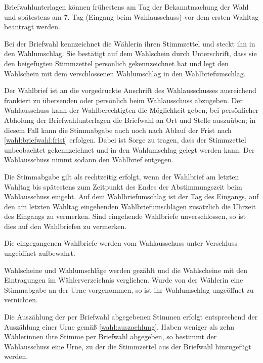 Briefwahlunterlagen können frühestens am Tag der Bekanntmachung der Wahl und spätestens am 7. Tag (Eingang beim Wahlausschuss) vor dem ersten Wahltag beantragt werden. \label{wahl:briefwahl:frist}

Bei der Briefwahl kennzeichnet die Wählerin ihren Stimmzettel und steckt ihn in den Wahlumschlag. Sie bestätigt auf dem Wahlschein durch Unterschrift, dass sie den beigefügten Stimmzettel persönlich gekennzeichnet hat und legt den Wahlschein mit dem verschlossenen Wahlumschlag in den Wahlbriefumschlag.

Der Wahlbrief ist an die vorgedruckte Anschrift des Wahlausschusses ausreichend frankiert zu übersenden oder persönlich beim Wahlausschuss abzugeben. Der Wahlausschuss kann der Wahlberechtigten die Möglichkeit geben, bei persönlicher Abholung der Briefwahlunterlagen die Briefwahl an Ort und Stelle auszuüben; in diesem Fall kann die Stimmabgabe auch noch nach Ablauf der Frist nach \ref{wahl:briefwahl:frist} erfolgen. Dabei ist Sorge zu tragen, dass der Stimmzettel unbeobachtet gekennzeichnet und in den Wahlumschlag gelegt werden kann. Der Wahlausschuss nimmt sodann den Wahlbrief entgegen.

Die Stimmabgabe gilt als rechtzeitig erfolgt, wenn der Wahlbrief am letzten Wahltag bis spätestens zum Zeitpunkt des Endes der Abstimmungszeit beim Wahlausschuss eingeht. Auf dem Wahlbriefumschlag ist der Tag des Eingangs, auf den am letzten Wahltag eingehenden Wahlbriefumschlägen zusätzlich die Uhrzeit des Eingangs zu vermerken. Sind eingehende Wahlbriefe unverschlossen, so ist dies auf den Wahlbriefen zu vermerken.

Die eingegangenen Wahlbriefe werden vom Wahlausschuss unter Verschluss ungeöffnet aufbewahrt.

Wahlscheine und Wahlumschläge werden gezählt und die Wahlscheine mit den Eintragungen im Wählerverzeichnis verglichen. Wurde von der Wählerin eine Stimmabgabe an der Urne vorgenommen, so ist ihr Wahlumschlag ungeöffnet zu vernichten.

Die Auszählung der per Briefwahl abgegebenen Stimmen erfolgt entsprechend der Auszählung einer Urne gemäß \ref{wahl:auszaehlung}. Haben weniger als zehn Wählerinnen ihre Stimme per Briefwahl abgegeben, so bestimmt der Wahlausschuss eine Urne, zu der die Stimmzettel aus der Briefwahl hinzugefügt werden.

\label{wahl:stimmzettel}

